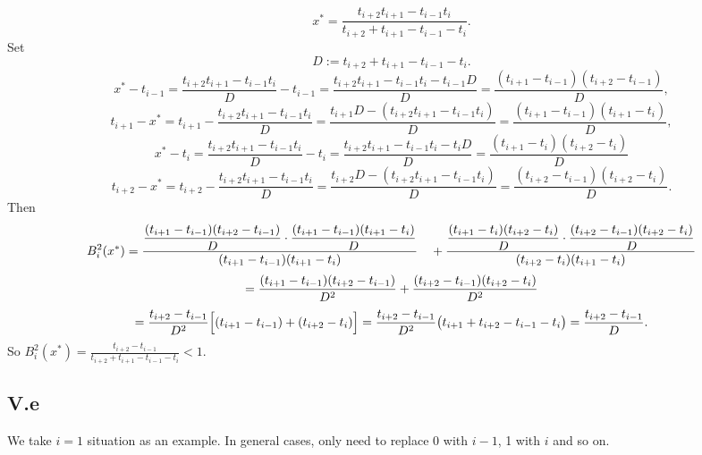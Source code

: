 \documentclass[a4paper]{article}
\begin{document}
\[
x^* = \frac{t_{i+2}t_{i+1}-t_{i-1}t_i}{t_{i+2}+t_{i+1}-t_{i-1}-t_i}.
\]
Set
\[
D := t_{i+2}+t_{i+1}-t_{i-1}-t_i.
\]
\[
x^* - t_{i-1} =
 \frac{t_{i+2}t_{i+1}-t_{i-1}t_i}{D} - t_{i-1} =
 \frac{t_{i+2}t_{i+1}-t_{i-1}t_i - t_{i-1}D}{D} = 
\frac{(t_{i+1}-t_{i-1})(t_{i+2}-t_{i-1})}{D},
\]
\[
t_{i+1} - x^*
= t_{i+1} - \frac{t_{i+2}t_{i+1}-t_{i-1}t_i}{D} 
= \frac{t_{i+1}D - (t_{i+2}t_{i+1}-t_{i-1}t_i)}{D} 
= \frac{(t_{i+1}-t_{i-1})(t_{i+1}-t_i)}{D},
\]
\[
x^* - t_i
= \frac{t_{i+2}t_{i+1}-t_{i-1}t_i}{D} - t_i 
= \frac{t_{i+2}t_{i+1}-t_{i-1}t_i - t_iD}{D} 
= \frac{(t_{i+1}-t_i)(t_{i+2}-t_i)}{D}
\]
\[
t_{i+2} - x^*
= t_{i+2} - \frac{t_{i+2}t_{i+1}-t_{i-1}t_i}{D} 
= \frac{t_{i+2}D - (t_{i+2}t_{i+1}-t_{i-1}t_i)}{D} 
= \frac{(t_{i+2}-t_{i-1})(t_{i+2}-t_i)}{D}.
\]
Then
\[
B_i^2(x^*)
= \frac{\displaystyle
\frac{(t_{i+1}-t_{i-1})(t_{i+2}-t_{i-1})}{D}
\cdot
\frac{(t_{i+1}-t_{i-1})(t_{i+1}-t_i)}{D}}
{(t_{i+1}-t_{i-1})(t_{i+1}-t_i)} \\
\quad
+ \frac{\displaystyle
\frac{(t_{i+1}-t_i)(t_{i+2}-t_i)}{D}
\cdot
\frac{(t_{i+2}-t_{i-1})(t_{i+2}-t_i)}{D}}
{(t_{i+2}-t_i)(t_{i+1}-t_i)} \\
\]
\[
= \frac{(t_{i+1}-t_{i-1})(t_{i+2}-t_{i-1})}{D^2}
+ \frac{(t_{i+2}-t_{i-1})(t_{i+2}-t_i)}{D^2} \\
\]
\[
= \frac{t_{i+2}-t_{i-1}}{D^2}
\Big[(t_{i+1}-t_{i-1}) + (t_{i+2}-t_i)\Big] \\
= \frac{t_{i+2}-t_{i-1}}{D^2}
\big(t_{i+1}+t_{i+2}-t_{i-1}-t_i\big) \\
= \frac{t_{i+2}-t_{i-1}}{D}.
\]
So $B_i^2(x^*) = \frac{t_{i+2}-t_{i-1}}{t_{i+2}+t_{i+1}-t_{i-1}-t_i} < 1.$
\subsection*{V.e}
We take $i = 1$ situation as an example. In general cases, only need to replace 0 with $i-1$, 1 with $i$ and so on.\\
\end{document}
